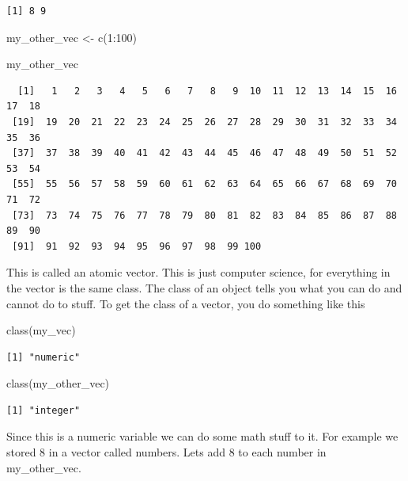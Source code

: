\documentclass[
  letterpaper,
  DIV=11,
  numbers=noendperiod,
  oneside]{scrreprt}
\newenvironment{Shaded}{\begin{snugshade}}{\end{snugshade}}
\newcommand{\DecValTok}[1]{\textcolor[rgb]{0.68,0.00,0.00}{#1}}
\newcommand{\FunctionTok}[1]{\textcolor[rgb]{0.28,0.35,0.67}{#1}}
\newcommand{\NormalTok}[1]{\textcolor[rgb]{0.00,0.23,0.31}{#1}}
\newcommand{\OtherTok}[1]{\textcolor[rgb]{0.00,0.23,0.31}{#1}}
\newcommand{\SpecialCharTok}[1]{\textcolor[rgb]{0.37,0.37,0.37}{#1}}
\begin{document}
\begin{verbatim}
[1] 8 9
\end{verbatim}

\begin{Shaded}
\begin{Highlighting}[]
\NormalTok{my\_other\_vec }\OtherTok{\textless{}{-}} \FunctionTok{c}\NormalTok{(}\DecValTok{1}\SpecialCharTok{:}\DecValTok{100}\NormalTok{)}

\NormalTok{my\_other\_vec}
\end{Highlighting}
\end{Shaded}

\begin{verbatim}
  [1]   1   2   3   4   5   6   7   8   9  10  11  12  13  14  15  16  17  18
 [19]  19  20  21  22  23  24  25  26  27  28  29  30  31  32  33  34  35  36
 [37]  37  38  39  40  41  42  43  44  45  46  47  48  49  50  51  52  53  54
 [55]  55  56  57  58  59  60  61  62  63  64  65  66  67  68  69  70  71  72
 [73]  73  74  75  76  77  78  79  80  81  82  83  84  85  86  87  88  89  90
 [91]  91  92  93  94  95  96  97  98  99 100
\end{verbatim}

This is called an atomic vector. This is just computer science, for
everything in the vector is the same class. The class of an object tells
you what you can do and cannot do to stuff. To get the class of a
vector, you do something like this

\begin{Shaded}
\begin{Highlighting}[]
\FunctionTok{class}\NormalTok{(my\_vec)}
\end{Highlighting}
\end{Shaded}

\begin{verbatim}
[1] "numeric"
\end{verbatim}

\begin{Shaded}
\begin{Highlighting}[]
\FunctionTok{class}\NormalTok{(my\_other\_vec)}
\end{Highlighting}
\end{Shaded}

\begin{verbatim}
[1] "integer"
\end{verbatim}

Since this is a numeric variable we can do some math stuff to it. For
example we stored 8 in a vector called numbers. Lets add 8 to each
number in my\_other\_vec.
\end{document}
